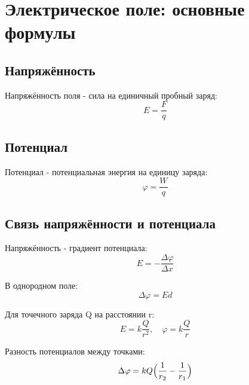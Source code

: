 \documentclass{article}
\begin{document}
\section*{Электрическое поле: основные формулы}

\subsection*{Напряжённость}
Напряжённость поля - сила на единичный пробный заряд:
\[
E = \frac{F}{q}
\]

\subsection*{Потенциал}
Потенциал - потенциальная энергия на единицу заряда:
\[
\varphi = \frac{W}{q}
\]

\subsection*{Связь напряжённости и потенциала}
Напряжённость - градиент потенциала:
\[
E = -\frac{\Delta \varphi}{\Delta x}
\]

В однородном поле:
\[
\Delta\varphi = Ed
\]

Для точечного заряда Q на расстоянии r:
\[
E = k \frac{Q}{r^2}, \quad \varphi = k \frac{Q}{r}
\]

Разность потенциалов между точками:
\[
\Delta\varphi = k Q\Bigl(\frac{1}{r_2} - \frac{1}{r_1}\Bigr)
\]
\end{document}
